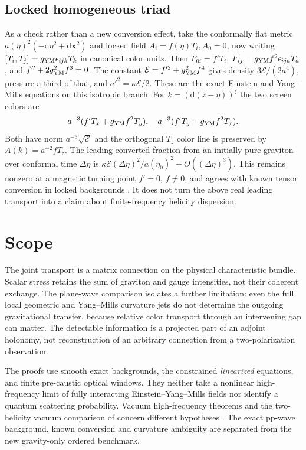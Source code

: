 \documentclass[11pt]{article}
\newcommand{\dd}{\mathrm d}
\begin{document}
\subsection{Locked homogeneous triad}
As a check rather than a new conversion effect, take the conformally flat metric \(a(\eta)^2(-\dd\eta^2+\dd\mathbf x^2)\) and locked field \(A_i=f(\eta)T_i,A_0=0\), now writing \([T_i,T_j]=g_{\rm YM}\epsilon_{ijk}T_k\) in canonical color units. Then \(F_{0i}=f'T_i\), \(F_{ij}=g_{\rm YM}f^2\epsilon_{ija}T_a\), and \(f''+2g_{\rm YM}^2f^3=0\). The constant \(\mathcal E=f'^2+g_{\rm YM}^2 f^4\) gives density \(3\mathcal E/(2a^4)\), pressure a third of that, and \(a'^2=\kappa\mathcal E/2\). These are the exact Einstein and Yang--Mills equations on this isotropic branch. For \(k=(\dd(z-\eta))^\sharp\) the two screen colors are
\[
 a^{-3}(f'T_x+g_{\rm YM} f^2T_y),
 \quad a^{-3}(f'T_y-g_{\rm YM} f^2T_x).
\]
Both have norm \(a^{-3}\sqrt{\mathcal E}\) and the orthogonal \(T_z\) color line is preserved by \(A(k)=a^{-2}fT_z\). The leading converted fraction from an initially pure graviton over conformal time \(\Delta\eta\) is \(\kappa\mathcal E(\Delta\eta)^2/a(\eta_0)^2+O((\Delta\eta)^3)\). This remains nonzero at a magnetic turning point \(f'=0\), \(f\ne0\), and agrees with known tensor conversion in locked backgrounds \cite{bc,cdm}. It does not turn the above real leading transport into a claim about finite-frequency helicity dispersion.

\section{Scope}

The joint transport is a matrix connection on the physical characteristic bundle. Scalar stress retains the sum of graviton and gauge intensities, not their coherent exchange. The plane-wave comparison isolates a further limitation: even the full local geometric and Yang--Mills curvature jets do not determine the outgoing gravitational transfer, because relative color transport through an intervening gap can matter. The detectable information is a projected part of an adjoint holonomy, not reconstruction of an arbitrary connection from a two-polarization observation.

The proofs use smooth exact backgrounds, the constrained \emph{linearized} equations, and finite pre-caustic optical windows. They neither take a nonlinear high-frequency limit of fully interacting Einstein--Yang--Mills fields nor identify a quantum scattering probability. Vacuum high-frequency theorems and the two-helicity vacuum comparison of \cite{p29b} concern different hypotheses \cite{hl,touati}. The exact pp-wave background, known conversion and curvature ambiguity are separated from the new gravity-only ordered benchmark.
\end{document}
